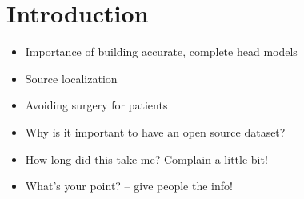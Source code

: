%
\section{Introduction}
\label{sec:intro}

\begin{itemize}

\item Importance of building accurate, complete head models

\item Source localization

\item Avoiding surgery for patients

\item Why is it important to have an open source dataset?

\item How long did this take me? Complain a little bit!

\item What's your point? -- give people the info!

\end{itemize}



